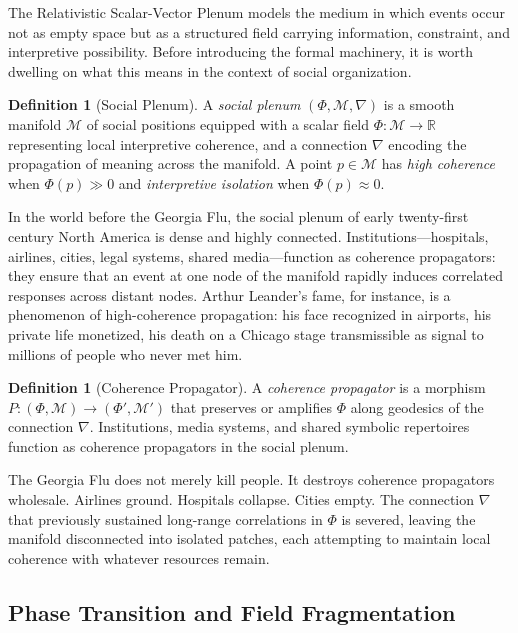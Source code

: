 \documentclass[12pt, oneside]{article}
\theoremstyle{plain}
\theoremstyle{definition}
\newtheorem{definition}[theorem]{Definition}
\theoremstyle{remark}
\newcommand{\Field}{\Phi}
\newcommand{\R}{\mathbb{R}}
\begin{document}
The Relativistic Scalar-Vector Plenum models the medium in which
events occur not as empty space but as a structured field carrying
information, constraint, and interpretive possibility. Before
introducing the formal machinery, it is worth dwelling on what this
means in the context of social organization.

\begin{definition}[Social Plenum]
A \emph{social plenum} $(\Field, \mathcal{M}, \nabla)$ is a smooth
manifold $\mathcal{M}$ of social positions equipped with a scalar
field $\Field : \mathcal{M} \to \R$ representing local interpretive
coherence, and a connection $\nabla$ encoding the propagation of
meaning across the manifold. A point $p \in \mathcal{M}$ has
\emph{high coherence} when $\Field(p) \gg 0$ and
\emph{interpretive isolation} when $\Field(p) \approx 0$.
\end{definition}

In the world before the Georgia Flu, the social plenum of early
twenty-first century North America is dense and highly connected.
Institutions---hospitals, airlines, cities, legal systems, shared
media---function as coherence propagators: they ensure that an event
at one node of the manifold rapidly induces correlated responses
across distant nodes. Arthur Leander's fame, for instance, is a
phenomenon of high-coherence propagation: his face recognized in
airports, his private life monetized, his death on a Chicago stage
transmissible as signal to millions of people who never met him.

\begin{definition}[Coherence Propagator]
A \emph{coherence propagator} is a morphism $P : (\Field, \mathcal{M})
\to (\Field', \mathcal{M}')$ that preserves or amplifies $\Field$
along geodesics of the connection $\nabla$. Institutions, media
systems, and shared symbolic repertoires function as coherence
propagators in the social plenum.
\end{definition}

The Georgia Flu does not merely kill people. It destroys coherence
propagators wholesale. Airlines ground. Hospitals collapse. Cities
empty. The connection $\nabla$ that previously sustained long-range
correlations in $\Field$ is severed, leaving the manifold
disconnected into isolated patches, each attempting to maintain local
coherence with whatever resources remain.

\subsection{Phase Transition and Field Fragmentation}
\end{document}
